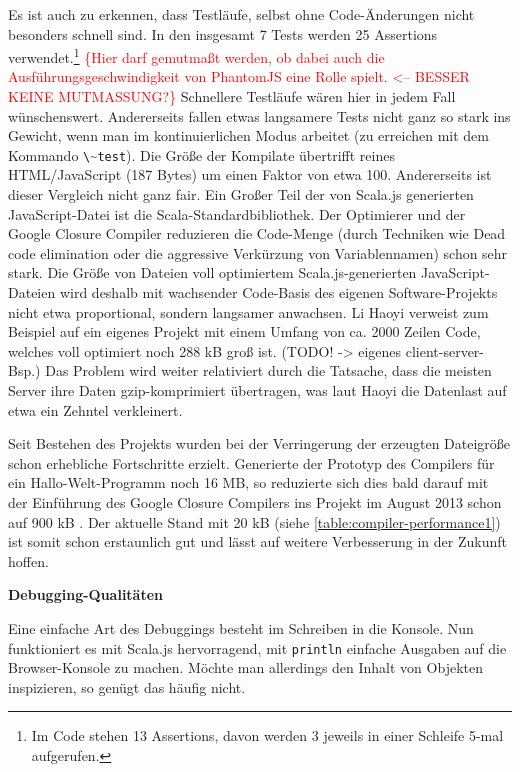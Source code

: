 \documentclass[a4paper, 12pt, hidelinks, listof=totoc, listoftables=totoc, bibliography=totoc]{scrreprt}
\newcommand{\code}[1]{\lstinline[language=Scala, style=inline]|#1|}
\newcommand{\scala}[1]{\lstinline[language=Scala, style=inline]|#1|}
\newcommand{\TODOi}[1]{\textcolor{red}{\{#1\}}}
\newcommand{\MyMiniSec}[1]{\rmfamily\fontsize{12}{15}\selectfont
	\vspace{7pt}\textbf{#1} %
}
\begin{document}
Es ist auch zu erkennen, dass Testläufe, selbst ohne Code-Änderungen nicht besonders schnell sind. In den insgesamt 7 Tests werden 25 Assertions verwendet.\footnote{Im Code stehen 13 Assertions, davon werden 3 jeweils in einer Schleife 5-mal aufgerufen.} \TODOi{Hier darf gemutmaßt werden, ob dabei auch die Ausführungsgeschwindigkeit von PhantomJS eine Rolle spielt.  <-- BESSER KEINE MUTMASSUNG?} Schnellere Testläufe wären hier in jedem Fall wünschenswert. Andererseits fallen etwas langsamere Tests nicht ganz so stark ins Gewicht, wenn man im kontinuierlichen Modus arbeitet (zu erreichen mit dem Kommando \code{\~test}).
Die Größe der Kompilate übertrifft reines \ac{HTML}/JavaScript (187 Bytes) um einen Faktor von etwa 100. Andererseits ist dieser Vergleich nicht ganz fair. Ein Großer Teil der von Scala.js generierten JavaScript-Datei ist die Scala-Standardbibliothek.
Der Optimierer und der Google Closure Compiler reduzieren die Code-Menge (durch Techniken wie Dead code elimination oder die aggressive Verkürzung von Variablennamen) schon sehr stark. Die Größe von Dateien voll optimiertem Scala.js-generierten JavaScript-Dateien wird deshalb mit wachsender Code-Basis des eigenen Software-Projekts nicht etwa proportional, sondern langsamer anwachsen. Li Haoyi verweist zum Beispiel auf ein eigenes Projekt mit einem Umfang von ca. 2000 Zeilen Code, welches voll optimiert noch 288 kB groß ist. (TODO! -> eigenes client-server-Bsp.) Das Problem wird weiter relativiert durch die Tatsache, dass die meisten Server ihre Daten gzip-komprimiert übertragen, was laut Haoyi die Datenlast auf etwa ein Zehntel verkleinert.\cite[\#BlobSize]{haoyi.HOS}

Seit Bestehen des Projekts wurden bei der Verringerung der erzeugten Dateigröße schon erhebliche Fortschritte erzielt. Generierte der Prototyp des Compilers für ein Hallo-Welt-Programm noch 16 MB, so reduzierte sich dies bald darauf mit der Einführung des Google Closure Compilers ins Projekt im August 2013 schon auf 900 kB \cite[Folie 5 f., Min. 6]{doeraene2014.WHB}. Der aktuelle Stand mit 20 kB (siehe \ref{table:compiler-performance1}) ist somit schon erstaunlich gut und lässt auf weitere Verbesserung in der Zukunft hoffen.

\MyMiniSec{Debugging-Qualitäten}


Eine einfache Art des Debuggings besteht im Schreiben in die Konsole. Nun funktioniert es mit Scala.js hervorragend, mit \scala{println} einfache Ausgaben auf die Browser-Konsole zu machen. Möchte man allerdings den Inhalt von Objekten inspizieren, so genügt das häufig nicht. 
\end{document}
